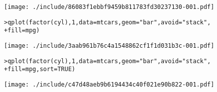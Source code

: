 \texttt{[image: ./include/86083f1ebbf9459b811783fd30237130-001.pdf]}
\begin{alltt}

> qplot(factor(cyl), 1, data = mtcars, geom = "bar", avoid = "stack", 
+     fill = mpg)
\end{alltt}
\texttt{[image: ./include/3aab961b76c4a1548862cf1f1d031b3c-001.pdf]}
\begin{alltt}

> qplot(factor(cyl), 1, data = mtcars, geom = "bar", avoid = "stack", 
+     fill = mpg, sort = TRUE)
\end{alltt}
\texttt{[image: ./include/c47d48aeb9b6194434c40f021e90b822-001.pdf]}
\begin{alltt}

\end{alltt}
